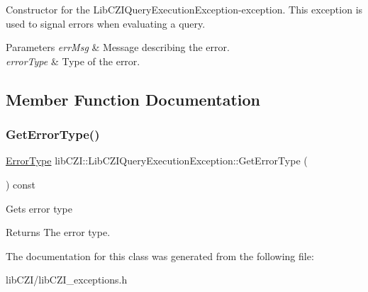 Constructor for the Lib\+C\+Z\+I\+Query\+Execution\+Exception-\/exception. This exception is used to signal errors when evaluating a query. 
\begin{DoxyParams}{Parameters}
{\em err\+Msg} & Message describing the error. \\
\hline
{\em error\+Type} & Type of the error. \\
\hline
\end{DoxyParams}


\subsection{Member Function Documentation}
\mbox{\label{classlib_c_z_i_1_1_lib_c_z_i_query_execution_exception_a6ac7e255c61dae5fc104f0ae54d10513}} 
\subsubsection{\texorpdfstring{Get\+Error\+Type()}{GetErrorType()}}
{\footnotesize\ttfamily \hyperlink{classlib_c_z_i_1_1_lib_c_z_i_query_execution_exception_a7420fe8895248c44d16cf34f23f0c6a2}{Error\+Type} lib\+C\+Z\+I\+::\+Lib\+C\+Z\+I\+Query\+Execution\+Exception\+::\+Get\+Error\+Type (\begin{DoxyParamCaption}{ }\end{DoxyParamCaption}) const\hspace{0.3cm}{\ttfamily [inline]}}

Gets error type \begin{DoxyReturn}{Returns}
The error type. 
\end{DoxyReturn}


The documentation for this class was generated from the following file\+:\begin{DoxyCompactItemize}
\item 
lib\+C\+Z\+I/lib\+C\+Z\+I\+\_\+exceptions.\+h\end{DoxyCompactItemize}
